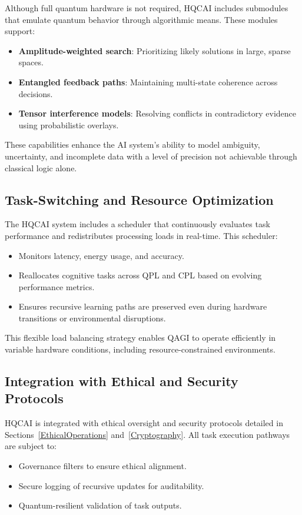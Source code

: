 \documentclass{article}
\theoremstyle{plain}
\theoremstyle{claimstyle}
\begin{document}
Although full quantum hardware is not required, HQCAI includes submodules that emulate quantum behavior through algorithmic means. These modules support:
\begin{itemize}
    \item \textbf{Amplitude-weighted search}: Prioritizing likely solutions in large, sparse spaces.
    \item \textbf{Entangled feedback paths}: Maintaining multi-state coherence across decisions.
    \item \textbf{Tensor interference models}: Resolving conflicts in contradictory evidence using probabilistic overlays.
\end{itemize}

These capabilities enhance the AI system’s ability to model ambiguity, uncertainty, and incomplete data with a level of precision not achievable through classical logic alone.

\subsection{Task-Switching and Resource Optimization}

The HQCAI system includes a scheduler that continuously evaluates task performance and redistributes processing loads in real-time. This scheduler:
\begin{itemize}
    \item Monitors latency, energy usage, and accuracy.
    \item Reallocates cognitive tasks across QPL and CPL based on evolving performance metrics.
    \item Ensures recursive learning paths are preserved even during hardware transitions or environmental disruptions.
\end{itemize}

This flexible load balancing strategy enables QAGI to operate efficiently in variable hardware conditions, including resource-constrained environments.

\subsection{Integration with Ethical and Security Protocols}

HQCAI is integrated with ethical oversight and security protocols detailed in Sections~\ref{EthicalOperations} and~\ref{Cryptography}. All task execution pathways are subject to:
\begin{itemize}
    \item Governance filters to ensure ethical alignment.
    \item Secure logging of recursive updates for auditability.
    \item Quantum-resilient validation of task outputs.
\end{itemize}
\end{document}
